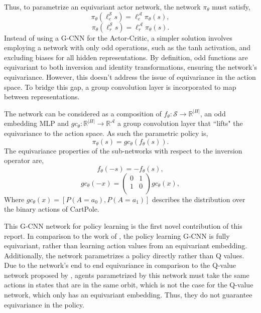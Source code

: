 Thus, to parametrize an equivariant actor network, the network $\pi_\theta$ must satisfy,
\begin{equation}
	\pi_\theta(\ell^\mathcal{S}_e s) = \ell^\mathcal{A}_e \pi_\theta(s),
\end{equation}
\begin{equation}
	\pi_\theta(\ell^\mathcal{S}_r s) = \ell^\mathcal{A}_r \pi_\theta(s).
\end{equation}
Instead of using a G-CNN for the Actor-Critic, a simpler solution involves employing a network with only odd operations, such as the tanh activation, and excluding biases for all hidden representations. By definition, odd functions are equivariant to both inversion and identity transformations, ensuring the network's equivariance. However, this doesn't address the issue of equivariance in the action space. To bridge this gap, a group convolution layer is incorporated to map between representations.

The network can be considered as a composition of $f_\theta : \mathcal{S} \rightarrow \mathbb{R}^{|H|}$, an odd embedding MLP and $gc_\theta: \mathbb{R}^{|H|} \rightarrow \mathbb{R}^{\mathcal{A}}$ a group convolution layer that ``lifts" the equivariance to the action space. As such the parametric policy is,
\begin{equation}
	\pi_\theta(s) = gc_\theta(f_\theta(s)).
\end{equation}
The equivariance properties of the sub-networks with respect to the inversion operator are,
\begin{equation}
	f_\theta(-s) = -f_\theta(s),
\end{equation}
\begin{equation}
	gc_\theta(-x) =
	\begin{pmatrix}
		0 & 1 \\
		1 & 0 \\
	\end{pmatrix}
	gc_\theta(x),
\end{equation}
Where $gc_\theta(x) = [P(A=a_0), P(A=a_1)]$ describes the distribution over the binary actions of CartPole.

This G-CNN network for policy learning is the first novel contribution of this report. In comparison to the work of \cite{mondal2020group}, the policy learning G-CNN is fully equivariant, rather than learning action values from an equivariant embedding. Additionally, the network parametrizes a policy directly rather than Q values. Due to the network's end to end equivariance in comparison to the Q-value network proposed by \cite{mondal2020group}, agents parametrized by this network must take the same actions in states that are in the same orbit, which is not the case for the Q-value network, which only has an equivariant embedding. Thus, they do not guarantee equivariance in the policy.

